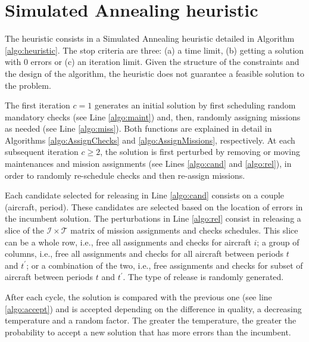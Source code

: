 \chapter{Simulated Annealing heuristic}

  The heuristic consists in a Simulated Annealing heuristic detailed in Algorithm \ref{algo:heuristic}. The stop criteria are three: (a) a time limit, (b) getting a solution with 0 errors or (c) an iteration limit. Given the structure of the constraints and the design of the algorithm, the heuristic does not guarantee a feasible solution to the problem.

  The first iteration $c=1$ generates an initial solution by first scheduling random mandatory checks (see Line \ref{algo:maint}) and, then, randomly assigning missions as needed (see Line \ref{algo:miss}). Both functions are explained in detail in Algorithms \ref{algo:AssignChecks} and \ref{algo:AssignMissions}, respectively. At each subsequent iteration $c \geq 2$, the solution is first perturbed by removing or moving maintenances and mission assignments (see Lines \ref{algo:cand} and \ref{algo:rel}), in order to randomly re-schedule checks and then re-assign missions.

  Each candidate selected for releasing in Line \ref{algo:cand} consists on a couple (aircraft, period). These candidates are selected based on the location of errors in the incumbent solution. The perturbations in Line \ref{algo:rel} consist in releasing a slice of the $\mathcal{I} \times \mathcal{T}$ matrix of mission assignments and checks schedules. This slice can be a whole row, i.e., free all assignments and checks for aircraft $i$; a group of columns, i.e., free all assignments and checks for all aircraft between periods $t$ and $t^\prime$; or a combination of the two, i.e., free assignments and checks for subset of aircraft between periods $t$ and $t^\prime$. The type of release is randomly generated.

  After each cycle, the solution is compared with the previous one (see line \ref{algo:accept}) and is accepted depending on the difference in quality, a decreasing temperature and a random factor. The greater the temperature, the greater the probability to accept a new solution that has more errors than the incumbent.


